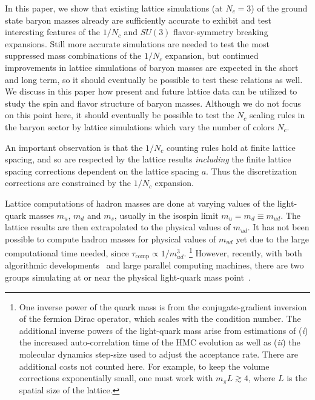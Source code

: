 \documentclass[twocolumn,nofootinbib,prd,aps,superscriptaddress,tightenlines]{revtex4}
\begin{document}
In this paper, we show that existing lattice simulations (at $N_c=3$) of the ground state baryon masses already are sufficiently accurate to exhibit and test interesting features of the $1/N_c$ and $SU(3)$ flavor-symmetry breaking expansions.  Still more accurate simulations are needed to test the most suppressed mass combinations of the $1/N_c$ expansion, but  continued improvements in lattice simulations of baryon masses are expected in the short and long term, so it should eventually be possible to test these relations as well.   We discuss in this paper how present and future lattice data can be utilized to study the spin and flavor structure of baryon masses.  Although we do not focus on this point here, it should eventually be possible to test the $N_c$ scaling rules in the baryon sector by lattice simulations which vary the number of colors $N_c$.

An important observation is that the $1/N_c$ counting rules hold at finite lattice spacing, and so are respected by the lattice results \emph{including} the finite lattice spacing corrections dependent on the lattice spacing $a$. Thus the discretization corrections are constrained by the $1/N_c$ expansion.

Lattice computations of hadron masses are done at varying values of the light-quark masses $m_u$, $m_d$ and $m_s$, usually in the isospin limit $m_{u}=m_{d}\equiv m_{ud}$. The lattice results are then extrapolated to the physical values of $m_{ud}$.  It has not been possible to compute hadron masses for physical values of $m_{ud}$ yet due to the large computational time needed, since $\tau_{\text{comp}} \propto 1/m_{ud}^3$.%
\footnote{
One inverse power of the quark mass is from the conjugate-gradient inversion of the fermion Dirac operator, which scales 
with the condition number.  The additional inverse powers of the light-quark mass arise from estimations of (\textit{i}) the increased auto-correlation time of the HMC evolution as well as (\textit{ii}) the molecular dynamics step-size used to adjust the acceptance rate.   There are additional costs not counted here. For example, to keep the volume corrections exponentially small, one must work with $m_\pi L \gtrsim 4$, where $L$ is the spatial size of the lattice.} 
%
However, recently, with both algorithmic developments~\cite{Kennedy:2004ae} and large parallel computing machines, there are two groups simulating at or near the physical light-quark mass point~\cite{Durr:2009ma,Aoki:2008sm}.  
\end{document}
